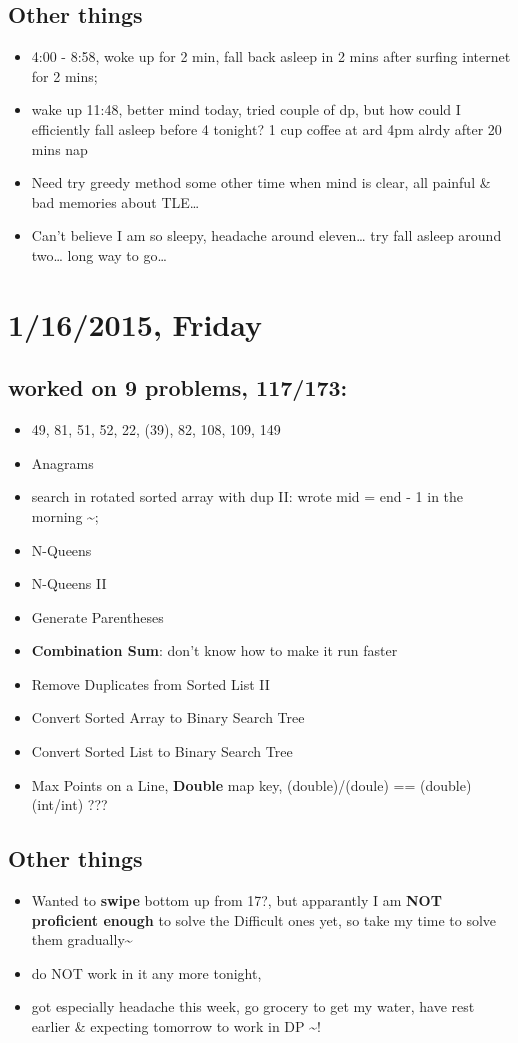 \documentclass[9pt,b5paper]{article}
\begin{document}
\subsection{Other things}
\label{sec-10-2}
\begin{itemize}
\item 4:00 - 8:58, woke up for 2 min, fall back asleep in 2 mins after surfing internet for 2 mins;
\item wake up 11:48, better mind today, tried couple of dp, but how could I efficiently fall asleep before 4 tonight? 1 cup coffee at ard 4pm alrdy after 20 mins nap
\item Need try greedy method some other time when mind is clear, all painful \& bad memories about TLE\ldots{}
\item Can't believe I am so sleepy, headache around eleven\ldots{} try fall asleep around two\ldots{} long way to go\ldots{}
\end{itemize}
\section{1/16/2015, Friday}
\label{sec-11}
\subsection{worked on 9 problems, 117/173:}
\label{sec-11-1}
\begin{itemize}
\item 49, 81, 51, 52, 22, (39), 82, 108, 109, 149
\item Anagrams
\item search in rotated sorted array with dup II: wrote mid = end - 1 in the morning \textasciitilde{};
\item N-Queens
\item N-Queens II
\item Generate Parentheses
\item \textbf{Combination Sum}: don't know how to make it run faster
\item Remove Duplicates from Sorted List II
\item Convert Sorted Array to Binary Search Tree
\item Convert Sorted List to Binary Search Tree
\item Max Points on a Line, \textbf{Double} map key, (double)/(doule) == (double)(int/int) ???
\end{itemize}
\subsection{Other things}
\label{sec-11-2}
\begin{itemize}
\item Wanted to \textbf{swipe} bottom up from 17?, but apparantly I am \textbf{NOT proficient enough} to solve the Difficult ones yet, so take my time to solve them gradually\textasciitilde{}~
\item do NOT work in it any more tonight,
\item got especially headache this week, go grocery to get my water, have rest earlier \& expecting tomorrow to work in DP \textasciitilde{}!
\end{itemize}
\end{document}
